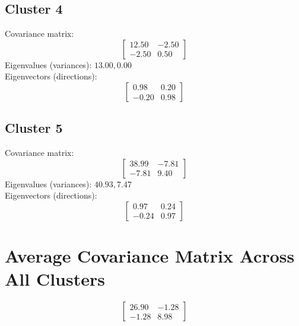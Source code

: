 \documentclass{article}
\begin{document}
\subsection*{Cluster 4}
Covariance matrix:
\[\begin{bmatrix}12.50 & -2.50 \\-2.50 & 0.50\end{bmatrix}\]
Eigenvalues (variances): $ 13.00, $0.00\\
Eigenvectors (directions):
\[\begin{bmatrix}0.98 & 0.20 \\-0.20 & 0.98\end{bmatrix}\]
\subsection*{Cluster 5}
Covariance matrix:
\[\begin{bmatrix}38.99 & -7.81 \\-7.81 & 9.40\end{bmatrix}\]
Eigenvalues (variances): $ 40.93, $7.47\\
Eigenvectors (directions):
\[\begin{bmatrix}0.97 & 0.24 \\-0.24 & 0.97\end{bmatrix}\]
\section*{Average Covariance Matrix Across All Clusters}
\[\begin{bmatrix}26.90 & -1.28 \\-1.28 & 8.98\end{bmatrix}\]
\end{document}
